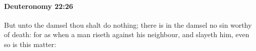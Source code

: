 
		\paragraph{Deuteronomy 22:26} %
			\label{DEUTERONOMY-22-26}

			But unto the damsel thou shalt do nothing; there is in the damsel no sin worthy of death: for as when a man riseth against his neighbour, and slayeth him, even so is this matter:


